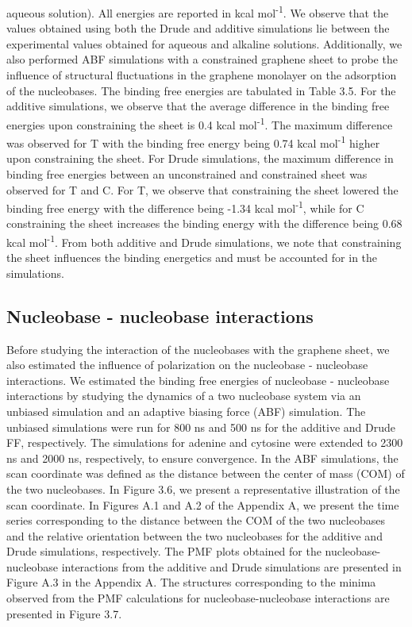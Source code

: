 aqueous solution).  All energies are reported in kcal mol\textsuperscript{-1}. We observe that the values obtained using both the Drude and additive simulations lie between the experimental values obtained for aqueous and alkaline solutions. Additionally, we also performed ABF simulations with a constrained graphene sheet to probe the influence of structural fluctuations in the graphene monolayer on the adsorption of the nucleobases. The binding free energies are tabulated in Table 3.5. For the additive simulations, we observe that the average difference in the binding free energies upon constraining the sheet is 0.4 kcal mol\textsuperscript{-1}. The maximum difference was observed for T with the binding free energy being 0.74 kcal mol\textsuperscript{-1} higher upon constraining the sheet. For Drude simulations, the maximum difference in binding free energies between an unconstrained and constrained sheet was observed for T and C. For T, we observe that constraining the sheet lowered the binding free energy with the difference being -1.34 kcal mol\textsuperscript{-1}, while for C constraining the sheet increases the binding energy with the difference being 0.68 kcal mol\textsuperscript{-1}. From both additive and Drude simulations, we note that constraining the sheet influences the binding energetics and must be accounted for in the simulations.
 
 \subsection{Nucleobase - nucleobase interactions}
 Before studying the interaction of the nucleobases with the graphene sheet, we also estimated the influence of polarization on the nucleobase - nucleobase interactions. We estimated the binding free energies of nucleobase - nucleobase interactions by studying the dynamics of a two nucleobase system via an unbiased simulation and an adaptive biasing force (ABF) simulation. The unbiased simulations were run for 800 ns and 500 ns for the additive and Drude FF, respectively. The simulations for adenine and cytosine were extended to 2300 ns and 2000 ns, respectively, to ensure convergence. In the ABF simulations, the scan coordinate was defined as the distance between the center of mass (COM) of the two nucleobases. In Figure 3.6, we present a representative illustration of the scan coordinate. In Figures A.1 and A.2 of the Appendix A, we present the time series corresponding to the distance between the COM of the two nucleobases and the relative orientation between the two nucleobases for the additive and Drude simulations, respectively. The PMF plots obtained for the nucleobase-nucleobase interactions from the additive and Drude simulations are presented in Figure A.3 in the Appendix A. The structures corresponding to the minima observed from the PMF calculations for nucleobase-nucleobase interactions are presented in Figure 3.7.

